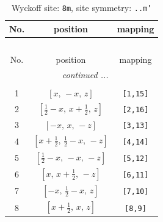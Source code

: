 \documentclass[fleqn,8pt]{jsarticle}
\begin{document}
\begin{longtable}{ccc}
\caption{Wyckoff site: {\tt 8m}, site symmetry: {\tt ..m'}}
 \\
 \hline \hline
No. & position & mapping \\ \hline \endfirsthead

\multicolumn{2}{l}{\tablename\ \thetable{}} \\
 \hline \hline
No. & position & mapping \\ \hline \endhead

 \hline \hline
\multicolumn{2}{r}{\footnotesize\it continued ...} \\ \endfoot

 \hline \hline
\multicolumn{2}{r}{} \\ \endlastfoot

1 & $\left[ x,\, - x,\, z \right]$ & {\tt [1,15]} \\ \hline
2 & $\left[ \frac{1}{2} - x,\, x + \frac{1}{2},\, z \right]$ & {\tt [2,16]} \\ \hline
3 & $\left[ - x,\, x,\, - z \right]$ & {\tt [3,13]} \\ \hline
4 & $\left[ x + \frac{1}{2},\, \frac{1}{2} - x,\, - z \right]$ & {\tt [4,14]} \\ \hline
5 & $\left[ \frac{1}{2} - x,\, - x,\, - z \right]$ & {\tt [5,12]} \\ \hline
6 & $\left[ x,\, x + \frac{1}{2},\, - z \right]$ & {\tt [6,11]} \\ \hline
7 & $\left[ - x,\, \frac{1}{2} - x,\, z \right]$ & {\tt [7,10]} \\ \hline
8 & $\left[ x + \frac{1}{2},\, x,\, z \right]$ & {\tt [8,9]} \\
\end{longtable}
\renewcommand{\arraystretch}{1.2}
\end{document}
